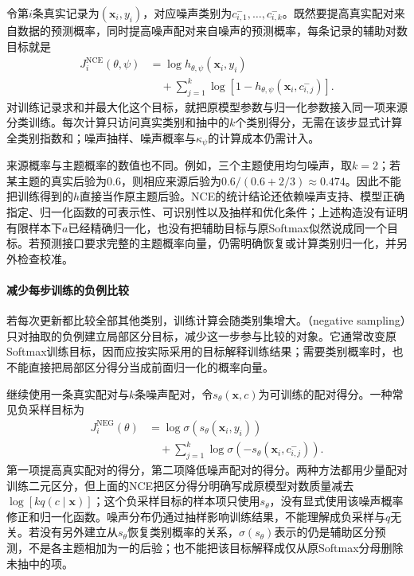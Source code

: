 令第$i$条真实记录为$(\bm x_i,y_i)$，对应噪声类别为$c^-_{i,1},\ldots,c^-_{i,k}$。既然要提高真实配对来自数据的预测概率，同时提高噪声配对来自噪声的预测概率，每条记录的辅助对数目标就是
\begin{equation}
  \label{eq:classification-nce-objective}
  \begin{aligned}
    J_i^{\mathrm{NCE}}(\theta,\psi)
      &=\log h_{\theta,\psi}(\bm x_i,y_i)\\
      &\quad+\sum_{j=1}^{k}
        \log[1-h_{\theta,\psi}(\bm x_i,c^-_{i,j})].
  \end{aligned}
\end{equation}
对训练记录求和并最大化这个目标，就把原模型参数与归一化参数接入同一项来源分类训练。每次计算只访问真实类别和抽中的$k$个类别得分，无需在该步显式计算全类别指数和；噪声抽样、噪声概率与$\kappa_{\psi}$的计算成本仍需计入。

来源概率与主题概率的数值也不同。例如，三个主题使用均匀噪声，取$k=2$；若某主题的真实后验为$0.6$，则相应来源后验为$0.6/(0.6+2/3)\approx0.474$。因此不能把训练得到的$h$直接当作原主题后验。NCE的统计结论还依赖噪声支持、模型正确指定、归一化函数的可表示性、可识别性以及抽样和优化条件；上述构造没有证明有限样本下$a$已经精确归一化，也没有把辅助目标与原Softmax似然说成同一个目标。若预测接口要求完整的主题概率向量，仍需明确恢复或计算类别归一化，并另外检查校准。

\paragraph{减少每步训练的负例比较}
\label{sec:classification-softmax-negative-sampling}

若每次更新都比较全部其他类别，训练计算会随类别集增大。（negative sampling）只对抽取的负例建立局部区分目标，减少这一步参与比较的对象。它通常改变原Softmax训练目标，因而应按实际采用的目标解释训练结果；需要类别概率时，也不能直接把局部区分得分当成前面归一化的概率向量。

继续使用一条真实配对与$k$条噪声配对，令$s_\theta(\bm x,c)$为可训练的配对得分。一种常见负采样目标为
\begin{equation}
  \label{eq:classification-negative-sampling-objective}
  \begin{aligned}
    J_i^{\mathrm{NEG}}(\theta)
      &=\log\sigma(s_\theta(\bm x_i,y_i))\\
      &\quad+\sum_{j=1}^{k}
        \log\sigma(-s_\theta(\bm x_i,c^-_{i,j})).
  \end{aligned}
\end{equation}
第一项提高真实配对的得分，第二项降低噪声配对的得分。两种方法都用少量配对训练二元区分，但上面的NCE把区分得分明确写成原模型对数质量减去$\log[kq(c\mid\bm x)]$；这个负采样目标的样本项只使用$s_\theta$，没有显式使用该噪声概率修正和归一化函数。噪声分布仍通过抽样影响训练结果，不能理解成负采样与$q$无关。若没有另外建立从$s_\theta$恢复类别概率的关系，$\sigma(s_\theta)$表示的仍是辅助区分预测，不是各主题相加为一的后验；也不能把该目标解释成仅从原Softmax分母删除未抽中的项。

